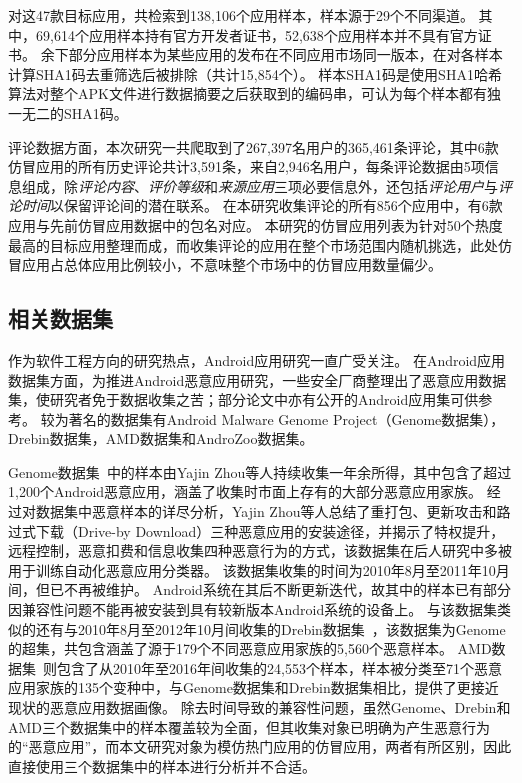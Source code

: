 对这47款目标应用，\mytool 共检索到138,106个应用样本，样本源于29个不同渠道。
其中，69,614个应用样本持有官方开发者证书，52,638个应用样本并不具有官方证书。
余下部分应用样本为某些应用的发布在不同应用市场同一版本，在对各样本计算SHA1码去重筛选后被排除（共计15,854个）。
样本SHA1码是使用SHA1哈希算法对整个APK文件进行数据摘要之后获取到的编码串，可认为每个样本都有独一无二的SHA1码。

评论数据方面，本次研究一共爬取到了267,397名用户的365,461条评论，其中6款仿冒应用的所有历史评论共计3,591条，来自2,946名用户，每条评论数据由5项信息组成，除\emph{评论内容}、\emph{评价等级}和\emph{来源应用}三项必要信息外，还包括\emph{评论用户}与\emph{评论时间}以保留评论间的潜在联系。
在本研究收集评论的所有856个应用中，有6款应用与先前仿冒应用数据中的包名对应。
本研究的仿冒应用列表为针对50个热度最高的目标应用整理而成，而收集评论的应用在整个市场范围内随机挑选，此处仿冒应用占总体应用比例较小，不意味整个市场中的仿冒应用数量偏少。


\subsection{相关数据集}

作为软件工程方向的研究热点，Android应用研究一直广受关注。
在Android应用数据集方面，为推进Android恶意应用研究，一些安全厂商整理出了恶意应用数据集，使研究者免于数据收集之苦；部分论文中亦有公开的Android应用集可供参考。
较为著名的数据集有Android Malware Genome Project（Genome数据集），Drebin数据集，AMD数据集和AndroZoo数据集。

Genome数据集~\cite{Zhou2012DissectingAM}中的样本由Yajin Zhou等人持续收集一年余所得，其中包含了超过1,200个Android恶意应用，涵盖了收集时市面上存有的大部分恶意应用家族。
经过对数据集中恶意样本的详尽分析，Yajin Zhou等人总结了重打包、更新攻击和路过式下载（Drive-by Download）三种恶意应用的安装途径，并揭示了特权提升，远程控制，恶意扣费和信息收集四种恶意行为的方式，该数据集在后人研究中多被用于训练自动化恶意应用分类器。
该数据集收集的时间为2010年8月至2011年10月间，但已不再被维护。
Android系统在其后不断更新迭代，故其中的样本已有部分因兼容性问题不能再被安装到具有较新版本Android系统的设备上。
与该数据集类似的还有与2010年8月至2012年10月间收集的Drebin数据集~\cite{arp2014drebin}，该数据集为Genome的超集，共包含涵盖了源于179个不同恶意应用家族的5,560个恶意样本。
AMD数据集~\cite{li2017android}则包含了从2010年至2016年间收集的24,553个样本，样本被分类至71个恶意应用家族的135个变种中，与Genome数据集和Drebin数据集相比，提供了更接近现状的恶意应用数据画像。
除去时间导致的兼容性问题，虽然Genome、Drebin和AMD三个数据集中的样本覆盖较为全面，但其收集对象已明确为产生恶意行为的``恶意应用''，而本文研究对象为模仿热门应用的仿冒应用，两者有所区别，因此直接使用三个数据集中的样本进行分析并不合适。

